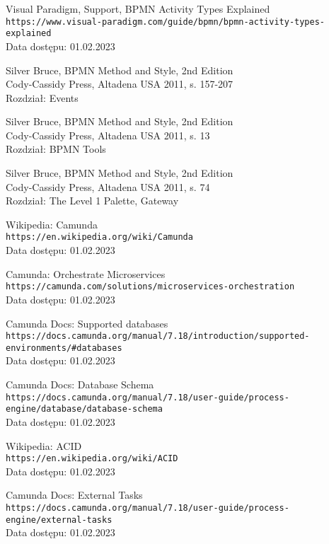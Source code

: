 \documentclass[declaration,shortabstract,mgr]{iithesis}
\begin{document}
\begin{thebibliography}{1}
Visual Paradigm, Support, BPMN Activity Types Explained \\
\texttt{https://www.visual-paradigm.com/guide/bpmn/bpmn-activity-types-explained} \\
Data dostępu: 01.02.2023

Silver Bruce, BPMN Method and Style, 2nd Edition \\
Cody-Cassidy Press, Altadena USA 2011, s. 157-207 \\
Rozdział: Events

Silver Bruce, BPMN Method and Style, 2nd Edition \\
Cody-Cassidy Press, Altadena USA 2011, s. 13 \\
Rozdział: BPMN Tools

Silver Bruce, BPMN Method and Style, 2nd Edition \\
Cody-Cassidy Press, Altadena USA 2011, s. 74 \\
Rozdział: The Level 1 Palette, Gateway

Wikipedia: Camunda \\
\texttt{https://en.wikipedia.org/wiki/Camunda} \\
Data dostępu: 01.02.2023

Camunda: Orchestrate Microservices \\
\texttt{https://camunda.com/solutions/microservices-orchestration} \\
Data dostępu: 01.02.2023

Camunda Docs: Supported databases \\
\texttt{https://docs.camunda.org/manual/7.18/introduction/supported-environments/\#databases} \\
Data dostępu: 01.02.2023

Camunda Docs: Database Schema \\
\texttt{https://docs.camunda.org/manual/7.18/user-guide/process-engine/database/database-schema} \\
Data dostępu: 01.02.2023

Wikipedia: ACID \\
\texttt{https://en.wikipedia.org/wiki/ACID} \\
Data dostępu: 01.02.2023

Camunda Docs: External Tasks \\
\texttt{https://docs.camunda.org/manual/7.18/user-guide/process-engine/external-tasks} \\
Data dostępu: 01.02.2023


\end{thebibliography}
\end{document}
